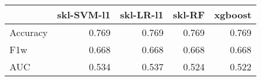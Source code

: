\begin{tabular}{lrrrr}
\toprule
{} &  skl-SVM-l1 &  skl-LR-l1 &  skl-RF &  xgboost \\
\midrule
Accuracy &       0.769 &      0.769 &   0.769 &    0.769 \\
F1w      &       0.668 &      0.668 &   0.668 &    0.668 \\
AUC      &       0.534 &      0.537 &   0.524 &    0.522 \\
\bottomrule
\end{tabular}
